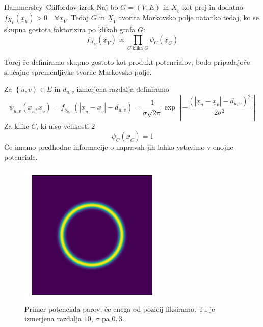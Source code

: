 \documentclass{beamer}
\theoremstyle{definition}
\begin{document}
	\begin{frame}
		\begin{block}{Hammersley–Cliffordov izrek}
			Naj bo $G = \left(V, E\right)$ in $\underline{X}_v$ kot prej in dodatno
			$f_{\underline{X}_V}\left(\underline{x}_V\right) > 0\quad \forall \underline{x}_V$.
			Tedaj $G$ in $\underline{X}_V$ tvorita Markovsko polje natanko tedaj,
			ko se skupna gostota faktorizira po klikah grafa $G$:
			$$f_{\underline{X}_V}\left(\underline{x}_V\right) \propto
				\prod_{C\;\text{klika}\;G}\psi_C\left(\underline{x}_C\right)$$
		\end{block}
		\pause
		Torej če definiramo skupno gostoto kot produkt potencialov, bodo
		pripadajoče slučajne spremenljivke tvorile Markovsko polje.
	\end{frame}

	\begin{frame}
		Za $\left\{u,v\right\} \in E$ in $d_{u,v}$ izmerjena razdalja definiramo
		$$
		\psi_{u,v}\left(\underline{x}_u,\underline{x}_v\right) =
		f_{\nu_{u, v}}\left(\left|\underline{x}_u-\underline{x}_v\right| - d_{u,v}\right) =
		\frac{1}{\sigma\sqrt{2\pi}} \exp\left[-\frac{\left(\left|\underline{x}_u-\underline{x}_v\right| - d_{u,v}\right)^2}{2 \sigma^2}\right]
		$$
		Za klike $C$, ki niso velikosti $2$
		$$
		\psi_C\left(\underline{x}_C\right)=1
		$$
		Če imamo predhodne informacije o napravah jih lahko vstavimo v enojne potenciale.
	\end{frame}

	\begin{frame}
		\begin{figure}[t]
			\includegraphics[width=7cm]{"pairwise_potential.png"}
			\caption{Primer potenciala parov, če enega od pozicij fiksiramo. Tu je izmerjena razdalja $10$, $\sigma$ pa $0{,}3$.}
			\centering
		\end{figure}
	\end{frame}
\end{document}
